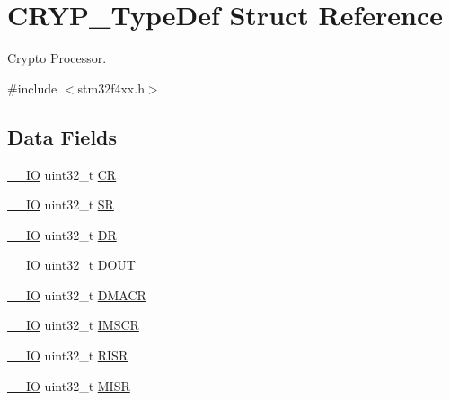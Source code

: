 \hypertarget{struct_c_r_y_p___type_def}{}\section{C\+R\+Y\+P\+\_\+\+Type\+Def Struct Reference}
\label{struct_c_r_y_p___type_def}


Crypto Processor.  




{\ttfamily \#include $<$stm32f4xx.\+h$>$}

\subsection*{Data Fields}
\begin{DoxyCompactItemize}
\item 
\hyperlink{group___c_m_s_i_s__core__definitions_gaec43007d9998a0a0e01faede4133d6be}{\+\_\+\+\_\+\+IO} uint32\+\_\+t \hyperlink{struct_c_r_y_p___type_def_ab40c89c59391aaa9d9a8ec011dd0907a}{CR}
\item 
\hyperlink{group___c_m_s_i_s__core__definitions_gaec43007d9998a0a0e01faede4133d6be}{\+\_\+\+\_\+\+IO} uint32\+\_\+t \hyperlink{struct_c_r_y_p___type_def_af6aca2bbd40c0fb6df7c3aebe224a360}{SR}
\item 
\hyperlink{group___c_m_s_i_s__core__definitions_gaec43007d9998a0a0e01faede4133d6be}{\+\_\+\+\_\+\+IO} uint32\+\_\+t \hyperlink{struct_c_r_y_p___type_def_a3df0d8dfcd1ec958659ffe21eb64fa94}{DR}
\item 
\hyperlink{group___c_m_s_i_s__core__definitions_gaec43007d9998a0a0e01faede4133d6be}{\+\_\+\+\_\+\+IO} uint32\+\_\+t \hyperlink{struct_c_r_y_p___type_def_ab8ba768d1dac54a845084bd07f4ef2b9}{D\+O\+UT}
\item 
\hyperlink{group___c_m_s_i_s__core__definitions_gaec43007d9998a0a0e01faede4133d6be}{\+\_\+\+\_\+\+IO} uint32\+\_\+t \hyperlink{struct_c_r_y_p___type_def_a082219a924d748e9c6092582aec06226}{D\+M\+A\+CR}
\item 
\hyperlink{group___c_m_s_i_s__core__definitions_gaec43007d9998a0a0e01faede4133d6be}{\+\_\+\+\_\+\+IO} uint32\+\_\+t \hyperlink{struct_c_r_y_p___type_def_adcdd7c23a99f81c21dae2e9f989632e1}{I\+M\+S\+CR}
\item 
\hyperlink{group___c_m_s_i_s__core__definitions_gaec43007d9998a0a0e01faede4133d6be}{\+\_\+\+\_\+\+IO} uint32\+\_\+t \hyperlink{struct_c_r_y_p___type_def_aa196fddf0ba7d6e3ce29bdb04eb38b94}{R\+I\+SR}
\item 
\hyperlink{group___c_m_s_i_s__core__definitions_gaec43007d9998a0a0e01faede4133d6be}{\+\_\+\+\_\+\+IO} uint32\+\_\+t \hyperlink{struct_c_r_y_p___type_def_a524e134cec519206cb41d0545e382978}{M\+I\+SR}

\end{DoxyCompactItemize}
